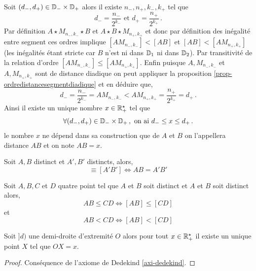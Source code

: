 Soit $(d_-,d_+)\in \mathbb{D}_- \times \mathbb{D}_+$ alors il existe $n_-,n_+, k_-, k_+$ tel que $$d_- = \dfrac{n_-}{2^{k_-}} \text{ et } d_+ = \dfrac{n_+}{2^{k_+}}\,.$$ Par définition $A\star M_{n_-,k_-} \star B$ et $A\star B \star M_{n_+,k_+}$ et donc par définition des inégalité entre segment ces ordres implique $[AM_{n_-,k_-}]< [AB]$ et $[AB] < [AM_{n_+,k_+}]$ (les inégalités étant stricte car $B$ n'est ni dans $\mathbb{D}_1$ ni dans $\mathbb{D}_2$). Par transitivité de la relation d'ordre $[A M_{n_-,k_-}]\leq [AM_{n_+,k_+}]$. Enfin puisque $A,M_{n_-,k_-}$ et $A,M_{n_+,k_+}$ sont de distance diadique on peut appliquer la proposition \ref{prop-ordredistancesegmentdiadique} et en déduire que,
\begin{equation*}
    d_- = \dfrac{n_-}{2^{k_-}} = A M_{n_-,k_-} < AM_{n_+,k_+} = \dfrac{n_+}{2^{k_+}} = d_+\,.
\end{equation*}
Ainsi il existe un unique nombre $x\in \mathbb{R}_+^\star$ tel que 
\begin{equation*}
    \forall (d_-,d_+)\in \mathbb{D}_- \times \mathbb{D}_+\,, \text{ on ai } d_- \leq x \leq d_+\,.
\end{equation*}
le nombre $x$ ne dépend dans sa construction que de $A$ et $B$ on l'appellera distance $AB$ et on note $AB=x$.
\begin{prop}
    Soit $A,B$ distinct et $A',B'$ distincts, alors,
    \begin{equation*}
        [AB]\equiv[A'B'] \Longleftrightarrow AB = A'B'
    \end{equation*}
\end{prop}
\begin{prop}
        Soit $A,B,C$ et $D$ quatre point tel que $A$ et $B$ soit distinct et $A$ et $B$ soit distinct alors,
    \begin{equation*}
        AB \leq CD \Longleftrightarrow [AB]\leq[CD]
    \end{equation*}
    et 
    \begin{equation*}
        AB <CD \Longleftrightarrow [AB]<[CD]
    \end{equation*}
\end{prop}
\begin{thm}
    Soit $]d)$ une demi-droite d'extremité $O$ alors pour tout $x \in \mathbb{R}_+^\star$ il existe un unique point $X$ tel que $OX = x$.
\begin{proof}
    Conséquence de l'axiome de Dedekind \ref{axi-dedekind}.
\end{proof}
\end{thm}

